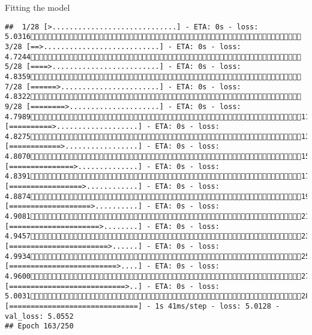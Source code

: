 \documentclass[
  ignorenonframetext,
]{beamer}
\begin{document}
\begin{frame}[fragile]{Fitting the model}
\begin{verbatim}
##  1/28 [>.............................] - ETA: 0s - loss: 5.0316 3/28 [==>...........................] - ETA: 0s - loss: 4.7244 5/28 [====>.........................] - ETA: 0s - loss: 4.8359 7/28 [======>.......................] - ETA: 0s - loss: 4.8322 9/28 [========>.....................] - ETA: 0s - loss: 4.798911/28 [==========>...................] - ETA: 0s - loss: 4.827513/28 [============>.................] - ETA: 0s - loss: 4.807015/28 [===============>..............] - ETA: 0s - loss: 4.839117/28 [=================>............] - ETA: 0s - loss: 4.887419/28 [===================>..........] - ETA: 0s - loss: 4.908121/28 [=====================>........] - ETA: 0s - loss: 4.945723/28 [=======================>......] - ETA: 0s - loss: 4.993425/28 [=========================>....] - ETA: 0s - loss: 4.960027/28 [===========================>..] - ETA: 0s - loss: 5.003128/28 [==============================] - 1s 41ms/step - loss: 5.0128 - val_loss: 5.0552
## Epoch 163/250

\end{verbatim}
\end{frame}
\end{document}
